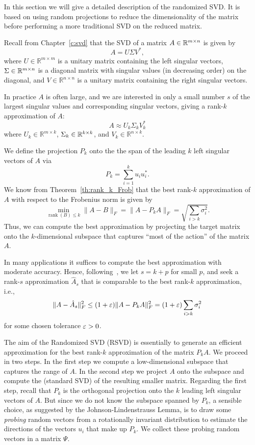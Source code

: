 In this section we will give a detailed description of the randomized SVD.
It is based on using random projections to reduce the dimensionality of the matrix before performing a more traditional SVD on the reduced matrix.


Recall from Chapter~\ref{c:svd} that  the SVD of  a matrix $A\in\mathbb{R}^{m\times n}$ is given by
\begin{equation}\label{eq:SVDrand}
 A = U \Sigma V^{\ast},
\end{equation}
where $U \in \mathbb{R}^{m \times m}$ is a unitary matrix containing the left singular vectors,
$\Sigma \in \mathbb{R}^{m \times n}$ is a diagonal matrix with singular values (in decreasing order) on the diagonal,
and $V \in \mathbb{R}^{n \times n}$ is a unitary matrix  containing the right singular vectors.

In practice $A$ is often large, and we are interested in only a small number $s$ of the largest singular values and corresponding singular vectors, giving a rank-$k$ approximation of $ A $:
$$
A \approx U_k \Sigma_k V_k^{\ast}
$$
where $ U_k \in \mathbb{R}^{m \times k} $, $ \Sigma_k \in \mathbb{R}^{k \times k} $, and $ V_k \in \mathbb{R}^{n \times k} $.


We define the projection $P_k$ onto the the span of the leading $k$ left singular vectors of $A$ via
$$
P_k = \sum_{i=1}^k u_i u_i^{\ast}.
$$
We know from Theorem~\ref{th:rank_k_Frob} that the best rank-$k$ approximation of $A$ with respect to the Frobenius norm is given by
$$\min_{\operatorname{rank}(B) \leq k} \|A - B \|_F = \|A - P_k A \|_F =  \sqrt{\sum_{i > k} \sigma_i^2}.$$
Thus, we can compute the best approximation by projecting the target matrix onto the $k$-dimensional
subspace that captures ``most of the action'' of the matrix $A$.

In many applications it suffices to compute the best approximation with moderate accuracy. Hence, following~\cite{HMT11}, we let $s=k+p$ for small $p$, and seek a rank-$s$ approximation $\hat{A}_s$ that is comparable to the best rank-$k$ approximation, i.e.,
$$\|A - \hat{A}_s\|_F^2  \le (1+\varepsilon) \|A - P_k A \|_F^2 = (1+\varepsilon)\sum_{i > k} \sigma_i^2 $$
for some chosen tolerance $\varepsilon > 0$.

The aim of the Randomized SVD (RSVD) is essentially to generate an efficient approximation for the best rank-$k$ approximation of the matrix $P_k A$. 
We  proceed in two steps. In the first step we compute a low-dimensional subspace that captures the range of $A$. In the second step we project $A$ onto the subspace and compute the (standard SVD) of the resulting smaller matrix.
Regarding the first step, recall that $P_k$ is the orthogonal projection  onto the $k$
leading left singular vectors of $A$. 
But since we do not know the subspace spanned by $P_k$, a sensible choice, as suggested by the  Johnson-Lindenstrauss Lemma,  is to draw some {\em probing} random vectors from a rotationally invariant distribution to estimate the directions of the vectors $u_i$ that make up $P_k$. We collect these probing random vectors in a matrix $\Psi$.



